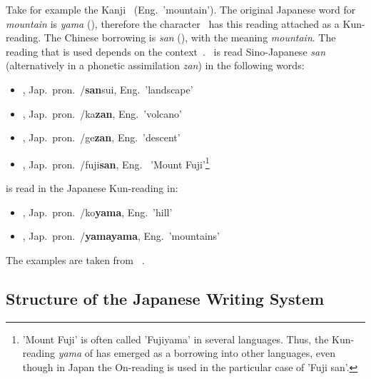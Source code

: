 Take for example the Kanji ~(Eng.~'mountain'). 
The original Japanese word for \emph{mountain} is \emph{yama} (),
therefore the character ~has this reading attached as a Kun-reading.
The Chinese borrowing is \emph{san} (), with the meaning 
\emph{mountain}. The reading that is used depends on the 
context~.
~is read Sino-Japanese \emph{san} (alternatively in a phonetic 
assimilation \emph{zan}) in the following words:
\begin{itemize}
  \item {}, Jap.~pron.~/\textbf{san}sui, Eng.~'landscape'
  \item {}, Jap.~pron.~/ka\textbf{zan}, Eng.~'volcano'
  \item {}, Jap.~pron.~/ge\textbf{zan}, Eng.~'descent'
  \item {}, Jap.~pron.~/fuji\textbf{san}, Eng.~
        'Mount Fuji'\footnote{'Mount Fuji' is often called 'Fujiyama' in 
        several languages. Thus, the Kun-reading \emph{yama} of  has 
        emerged as a borrowing into other languages, even though in Japan 
        the On-reading is used in the particular case of 'Fuji san'.}
\end{itemize}
 is read in the Japanese Kun-reading in:
\begin{itemize}
  \item {}, Jap.~pron.~/ko\textbf{yama}, Eng.~'hill'
  \item {}, Jap.~pron.~/\textbf{yamayama}, Eng.~'mountains'
\end{itemize}
The examples are taken from 
~\citeyear{Hadamitzky1995}.

\subsection{Structure of the Japanese Writing System}
\label{sec:structureofwritingsystem}

